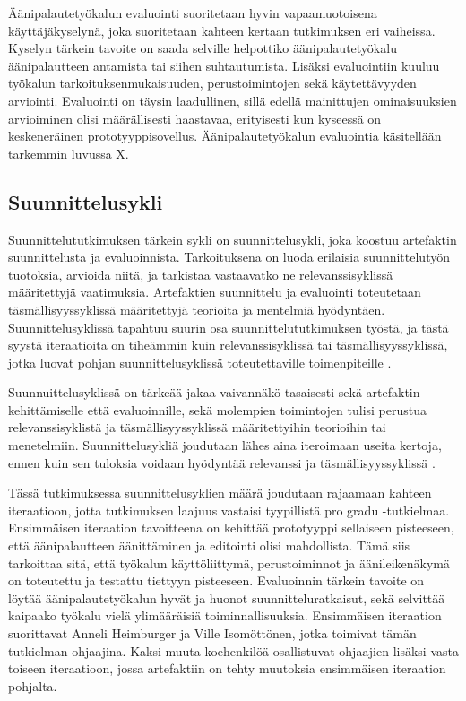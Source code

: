 \documentclass[utf8]{gradu3}
\begin{document}
Äänipalautetyökalun evaluointi suoritetaan hyvin vapaamuotoisena käyttäjäkyselynä, joka suoritetaan kahteen kertaan tutkimuksen eri vaiheissa. Kyselyn tärkein tavoite on saada selville helpottiko äänipalautetyökalu äänipalautteen antamista tai siihen suhtautumista. Lisäksi evaluointiin kuuluu työkalun tarkoituksenmukaisuuden, perustoimintojen sekä käytettävyyden arviointi. Evaluointi on täysin laadullinen, sillä edellä mainittujen ominaisuuksien arvioiminen olisi määrällisesti haastavaa, erityisesti kun kyseessä on keskeneräinen prototyyppisovellus. Äänipalautetyökalun evaluointia käsitellään tarkemmin luvussa X.

\subsection{Suunnittelusykli}

Suunnittelututkimuksen tärkein sykli on suunnittelusykli, joka koostuu artefaktin suunnittelusta ja evaluoinnista. Tarkoituksena on luoda erilaisia suunnittelutyön tuotoksia, arvioida niitä, ja tarkistaa vastaavatko ne relevanssisyklissä määritettyjä vaatimuksia. Artefaktien suunnittelu ja evaluointi toteutetaan täsmällisyyssyklissä määritettyjä teorioita ja mentelmiä hyödyntäen. Suunnittelusyklissä tapahtuu suurin osa suunnittelututkimuksen työstä, ja tästä syystä iteraatioita on tiheämmin kuin relevanssisyklissä tai täsmällisyyssyklissä, jotka luovat pohjan suunnittelusyklissä toteutettaville toimenpiteille \parencite[][]{cycles}.

Suunnuittelusyklissä on tärkeää jakaa vaivannäkö tasaisesti sekä artefaktin kehittämiselle että evaluoinnille, sekä molempien toimintojen tulisi perustua relevanssisyklistä ja täsmällisyyssyklissä määritettyihin teorioihin tai menetelmiin. Suunnittelusykliä joudutaan lähes aina iteroimaan useita kertoja, ennen kuin sen tuloksia voidaan hyödyntää relevanssi ja täsmällisyyssyklissä \parencite[][]{cycles}.

Tässä tutkimuksessa suunnittelusyklien määrä joudutaan rajaamaan kahteen iteraatioon, jotta tutkimuksen laajuus vastaisi tyypillistä pro gradu -tutkielmaa. Ensimmäisen iteraation tavoitteena on kehittää prototyyppi sellaiseen pisteeseen, että äänipalautteen äänittäminen ja editointi olisi mahdollista. Tämä siis tarkoittaa sitä, että työkalun käyttöliittymä, perustoiminnot ja äänileikenäkymä on toteutettu ja testattu tiettyyn pisteeseen. Evaluoinnin tärkein tavoite on löytää äänipalautetyökalun hyvät ja huonot suunnitteluratkaisut, sekä selvittää kaipaako työkalu vielä ylimääräisiä toiminnallisuuksia. Ensimmäisen iteraation suorittavat Anneli Heimburger ja Ville Isomöttönen, jotka toimivat tämän tutkielman ohjaajina. Kaksi muuta koehenkilöä osallistuvat ohjaajien lisäksi vasta toiseen iteraatioon, jossa artefaktiin on tehty muutoksia ensimmäisen iteraation pohjalta.
\end{document}
